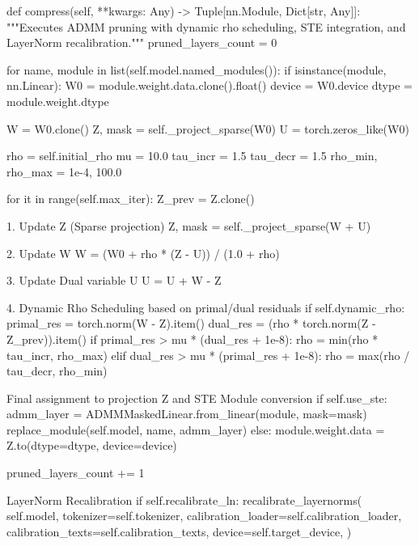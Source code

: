     def compress(self, **kwargs: Any) -> Tuple[nn.Module, Dict[str, Any]]:
        """Executes ADMM pruning with dynamic rho scheduling, STE integration, and LayerNorm recalibration."""
        pruned\_layers\_count = 0

        for name, module in list(self.model.named\_modules()):
            if isinstance(module, nn.Linear):
                W0 = module.weight.data.clone().float()
                device = W0.device
                dtype = module.weight.dtype

                W = W0.clone()
                Z, mask = self.\_project\_sparse(W0)
                U = torch.zeros\_like(W0)

                rho = self.initial\_rho
                mu = 10.0
                tau\_incr = 1.5
                tau\_decr = 1.5
                rho\_min, rho\_max = 1e-4, 100.0

                for it in range(self.max\_iter):
                    Z\_prev = Z.clone()

                     1. Update Z (Sparse projection)
                    Z, mask = self.\_project\_sparse(W + U)

                     2. Update W
                    W = (W0 + rho * (Z - U)) / (1.0 + rho)

                     3. Update Dual variable U
                    U = U + W - Z

                     4. Dynamic Rho Scheduling based on primal/dual residuals
                    if self.dynamic\_rho:
                        primal\_res = torch.norm(W - Z).item()
                        dual\_res = (rho * torch.norm(Z - Z\_prev)).item()
                        if primal\_res > mu * (dual\_res + 1e-8):
                            rho = min(rho * tau\_incr, rho\_max)
                        elif dual\_res > mu * (primal\_res + 1e-8):
                            rho = max(rho / tau\_decr, rho\_min)

                 Final assignment to projection Z and STE Module conversion
                if self.use\_ste:
                    admm\_layer = ADMMMaskedLinear.from\_linear(module, mask=mask)
                    replace\_module(self.model, name, admm\_layer)
                else:
                    module.weight.data = Z.to(dtype=dtype, device=device)

                pruned\_layers\_count += 1

         LayerNorm Recalibration
        if self.recalibrate\_ln:
            recalibrate\_layernorms(
                self.model,
                tokenizer=self.tokenizer,
                calibration\_loader=self.calibration\_loader,
                calibration\_texts=self.calibration\_texts,
                device=self.target\_device,
            )

